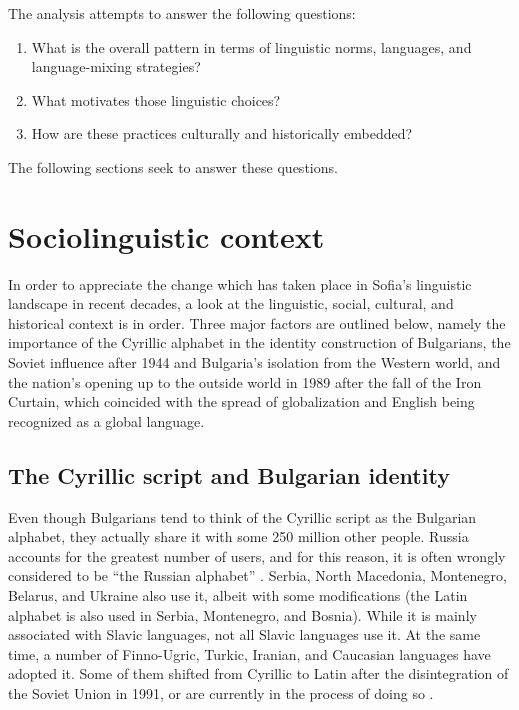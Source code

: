 \documentclass[output=paper]{langscibook}
\begin{document}
The analysis attempts to answer the following questions:

\begin{enumerate}
  \item What is the overall pattern in terms of linguistic norms, languages, and language-mixing strategies?
  \item What motivates those linguistic choices?
  \item How are these practices culturally and historically embedded?
\end{enumerate}

\noindent
The following sections seek to answer these questions.

\section{Sociolinguistic context} \label{slavova:sec:4}
In order to appreciate the change which has taken place in Sofia’s linguistic landscape in recent decades, a look at the linguistic, social, cultural, and historical context is in order. Three major factors are outlined below, namely the importance of the Cyrillic alphabet in the identity construction of Bulgarians, the Soviet influence after 1944 and Bulgaria’s isolation from the Western world, and the nation’s opening up to the outside world in 1989 after the fall of the Iron Curtain, which coincided with the spread of globalization and English being recognized as a global language.

\subsection{The Cyrillic script and Bulgarian identity}
Even though Bulgarians tend to think of the Cyrillic script as the Bulgarian alphabet, they actually share it with some 250 million other people. Russia accounts for the greatest number of users, and for this reason, it is often wrongly considered to be ``the Russian alphabet'' \citep{Nikolova.2021}. Serbia, North Macedonia, Montenegro, Belarus, and Ukraine also use it, albeit with some modifications (the Latin alphabet is also used in Serbia, Montenegro, and Bosnia). While it is mainly associated with Slavic languages, not all Slavic languages use it. At the same time, a number of Finno-Ugric, Turkic, Iranian, and Caucasian languages have adopted it. Some of them shifted from Cyrillic to Latin after the disintegration of the Soviet Union in 1991, or are currently in the process of doing so \citep{Iliev.2013}.
\end{document}
